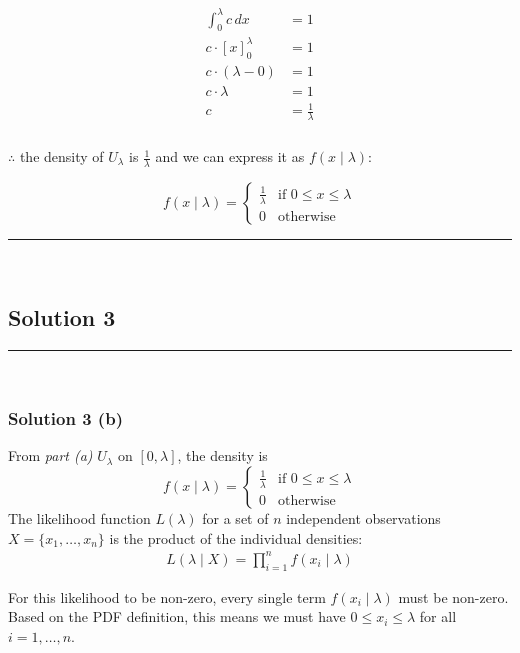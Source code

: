 \documentclass{article}
\begin{document}
\begin{align*}
    \int_{0}^{\lambda} c \,dx &= 1 \\
    c \cdot [x]_{0}^{\lambda} &= 1 \\
    c \cdot (\lambda - 0) &= 1 \\
    c \cdot \lambda &= 1 \\
    c &= \frac{1}{\lambda}
\end{align*}

\subsubsection*{\normalfont}{$\therefore$ the density of $U_{\lambda}$ is $\frac{1}{\lambda}$ and we can express it as $f(x \mid \lambda)$:}

$$
f(x \mid \lambda) = 
\begin{cases} 
      \frac{1}{\lambda} & \text{if } 0 \leq x \leq \lambda \\
      0 & \text{otherwise} 
\end{cases}
$$

\noindent\rule{\textwidth}{0.4pt}\\

\newpage

\subsection*{Solution 3}
\noindent\rule{\textwidth}{0.4pt}\\
\subsubsection*{Solution 3 (b)}

From \textit{part (a) } $U_{\lambda}$ on $[0,\lambda]$, the density is
$$
f(x \mid \lambda) = 
\begin{cases} 
      \frac{1}{\lambda} & \text{if } 0 \leq x \leq \lambda \\
      0 & \text{otherwise} 
\end{cases}
$$
The likelihood function $L(\lambda)$ for a set of $n$ independent observations $X = \{x_1, \ldots, x_n\}$ is the product of the individual densities:
\begin{align*}
    L(\lambda \mid X) = \prod_{i=1}^n f(x_i \mid \lambda)
\end{align*}
\begin{flushleft}
    For this likelihood to be non-zero, every single term $f(x_i \mid \lambda)$ must be non-zero. Based on the PDF definition, this means we must have $0 \leq x_i \leq \lambda$ for all $i = 1, \ldots, n$.
\end{flushleft}
\end{document}
